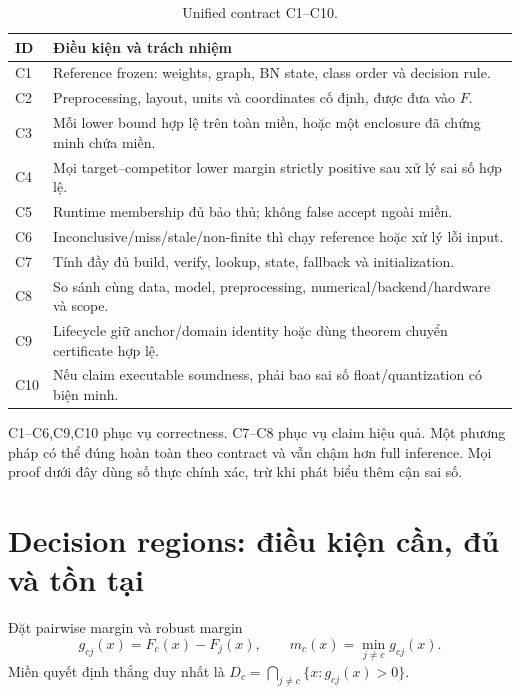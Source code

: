 \documentclass[11pt,a4paper]{article}
\theoremstyle{remark}
\begin{document}
\begin{table}[htbp]\centering
\caption{Unified contract C1--C10.}
\begin{tabularx}{\linewidth}{@{}p{1cm}Y@{}}\toprule
ID & Điều kiện và trách nhiệm\\\midrule
C1 & Reference frozen: weights, graph, BN state, class order và decision rule.\\
C2 & Preprocessing, layout, units và coordinates cố định, được đưa vào $F$.\\
C3 & Mỗi lower bound hợp lệ trên toàn miền, hoặc một enclosure đã chứng minh chứa miền.\\
C4 & Mọi target--competitor lower margin strictly positive sau xử lý sai số hợp lệ.\\
C5 & Runtime membership đủ bảo thủ; không false accept ngoài miền.\\
C6 & Inconclusive/miss/stale/non-finite thì chạy reference hoặc xử lý lỗi input.\\
C7 & Tính đầy đủ build, verify, lookup, state, fallback và initialization.\\
C8 & So sánh cùng data, model, preprocessing, numerical/backend/hardware và scope.\\
C9 & Lifecycle giữ anchor/domain identity hoặc dùng theorem chuyển certificate hợp lệ.\\
C10 & Nếu claim executable soundness, phải bao sai số float/quantization có biện minh.\\\bottomrule
\end{tabularx}
\end{table}
C1--C6,C9,C10 phục vụ correctness. C7--C8 phục vụ claim hiệu quả. Một phương
pháp có thể đúng hoàn toàn theo contract và vẫn chậm hơn full inference.
Mọi proof dưới đây dùng số thực chính xác, trừ khi phát biểu thêm cận sai số.

\section{Decision regions: điều kiện cần, đủ và tồn tại}
Đặt pairwise margin và robust margin
\begin{equation}
 g_{cj}(x)=F_c(x)-F_j(x),\qquad
 m_c(x)=\min_{j\ne c}g_{cj}(x).
 \label{eq:margin}
\end{equation}
Miền quyết định thắng duy nhất là
$D_c=\bigcap_{j\ne c}\{x:g_{cj}(x)>0\}$.
\end{document}
